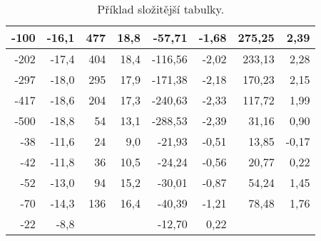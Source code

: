 \begin{table}[htbp]
\begin{tabular}{|r|r||r|r||r|r||r|r|}
	           -100 &          -16,1 &                  477 &          18,8 &          -57,71 &         -1,68 &               275,25 &                 2,39 \\ \hline
	           -202 &          -17,4 &                  404 &          18,4 &         -116,56 &         -2,02 &               233,13 &                 2,28 \\ \hline
	           -297 &          -18,0 &                  295 &          17,9 &         -171,38 &         -2,18 &               170,23 &                 2,15 \\ \hline
	           -417 &          -18,6 &                  204 &          17,3 &         -240,63 &         -2,33 &               117,72 &                 1,99 \\ \hline
	           -500 &          -18,8 &                   54 &          13,1 &         -288,53 &         -2,39 &                31,16 &                 0,90 \\ \hline
	            -38 &          -11,6 &                   24 &           9,0 &          -21,93 &         -0,51 &                13,85 &                -0,17 \\ \hline
	            -42 &          -11,8 &                   36 &          10,5 &          -24,24 &         -0,56 &                20,77 &                 0,22 \\ \hline
	            -52 &          -13,0 &                   94 &          15,2 &          -30,01 &         -0,87 &                54,24 &                 1,45 \\ \hline
	            -70 &          -14,3 &                  136 &          16,4 &          -40,39 &         -1,21 &                78,48 &                 1,76 \\ \hline
	            -22 &           -8,8 & \multicolumn{1}{r}{} &               &          -12,70 &          0,22 & \multicolumn{1}{r}{} & \multicolumn{1}{r}{} \\ \cline{1-2}\cline{5-6}
\end{tabular}
  \caption{Příklad složitější tabulky.}
   \label{tab:data} 
\end{table}

\clearpage